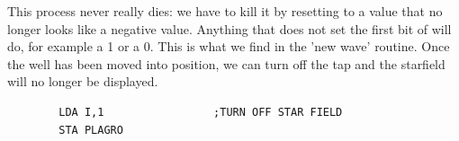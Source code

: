 This process never really dies: we have to kill it by resetting  to a value
that no longer looks like a negative value. Anything that does not set the first bit of 
will do, for example a 1 or a 0. This is what we find in the 'new wave' routine. Once the well has been
moved into position, we can turn off the tap and the starfield will no longer be displayed.
\begin{lstlisting}
        LDA I,1                 ;TURN OFF STAR FIELD
        STA PLAGRO
\end{lstlisting}

